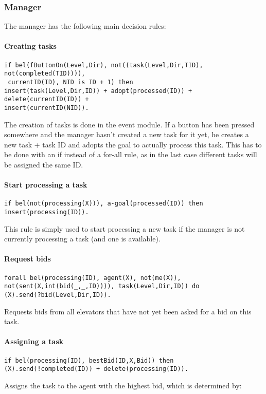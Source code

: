 \documentclass[a4paper,11pt]{article}
\begin{document}
\subsubsection{Manager}
The manager has the following main decision rules:

\paragraph*{Creating tasks}
\begin{verbatim}
if bel(fButtonOn(Level,Dir), not((task(Level,Dir,TID), not(completed(TID)))),
 currentID(ID), NID is ID + 1) then
insert(task(Level,Dir,ID)) + adopt(processed(ID)) + delete(currentID(ID)) + 
insert(currentID(NID)).
\end{verbatim}

The creation of tasks is done in the event module. If a button has been pressed somewhere and the manager hasn't created a new task for it yet, he creates a new task + task ID and adopts the goal to actually process this task. This has to be done with an if instead of a for-all rule, as in the last case different tasks will be assigned the same ID.

\paragraph*{Start processing a task}
\begin{verbatim}
if bel(not(processing(X))), a-goal(processed(ID)) then
insert(processing(ID)).
\end{verbatim}
This rule is simply used to start processing a new task if the manager is not currently processing a task (and one is available).

\paragraph*{Request bids}
\begin{verbatim}
forall bel(processing(ID), agent(X), not(me(X)), 
not(sent(X,int(bid(_,_,ID)))), task(Level,Dir,ID)) do
(X).send(?bid(Level,Dir,ID)).
\end{verbatim}
Requests bids from all elevators that have not yet been asked for a bid on this task.

\paragraph*{Assigning a task}
\begin{verbatim}
if bel(processing(ID), bestBid(ID,X,Bid)) then
(X).send(!completed(ID)) + delete(processing(ID)).
\end{verbatim}
Assigns the task to the agent with the highest bid, which is determined by:
\end{document}
